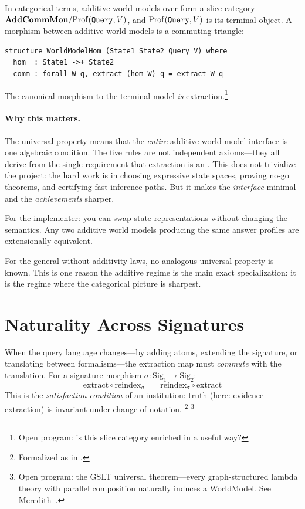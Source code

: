 \documentclass[11pt,openany]{report}
\begin{document}
In categorical terms, additive world models over  form a
slice category $\mathbf{AddCommMon} / \mathrm{Prof}(\texttt{Query}, V)$,
and $\mathrm{Prof}(\texttt{Query}, V)$ is its terminal object.  A
morphism between additive world models is a commuting triangle:

\begin{lstlisting}[language={}]
structure WorldModelHom (State1 State2 Query V) where
  hom  : State1 ->+ State2
  comm : forall W q, extract (hom W) q = extract W q
\end{lstlisting}

\noindent
The canonical morphism to the terminal model \emph{is}
extraction.\footnote{Open program: is this slice category enriched
in a useful way?}

\paragraph{Why this matters.}
The universal property means that the \emph{entire} additive
world-model interface is one algebraic condition.  The five rules
are not independent axioms---they all derive from the single
requirement that extraction is an .  This does
not trivialize the project: the hard work is in choosing expressive
state spaces, proving no-go theorems, and certifying fast inference
paths.  But it makes the \emph{interface} minimal and the
\emph{achievements} sharper.

For the implementer: you can swap state representations without
changing the semantics.  Any two additive world models producing the
same answer profiles are extensionally equivalent.

For the general  without additivity laws, no
analogous universal property is known.  This is one reason the additive
regime is the main exact specialization: it is the regime where the
categorical picture is sharpest.


\section{Naturality Across Signatures}
\label{sec:naturality}

When the query language changes---by adding atoms, extending the
signature, or translating between formalisms---the extraction map
must \emph{commute} with the translation.  For a signature morphism
$\sigma : \mathrm{Sig}_1 \to \mathrm{Sig}_2$:
\[
  \mathrm{extract} \circ \mathrm{reindex}_\sigma
  \;=\;
  \mathrm{reindex}_\sigma \circ \mathrm{extract}
\]
This is the \emph{satisfaction condition} of an institution: truth
(here: evidence extraction) is invariant under change of
notation.%
\footnote{Formalized as
 in
.}
\footnote{Open program: the GSLT universal theorem---every
graph-structured lambda theory with parallel composition naturally
induces a WorldModel.  See Meredith~\cite{meredith2026ccc}.}
\end{document}
